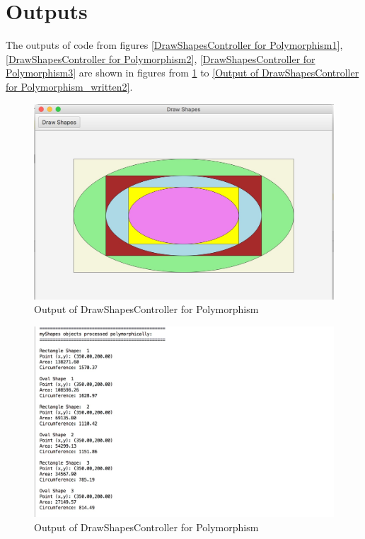 \documentclass[a4paper,12pt]{article}
\begin{document}
\section{Outputs}



The outputs of code from figures \ref{DrawShapesController for Polymorphism1},\ref{DrawShapesController for Polymorphism2}, \ref{DrawShapesController for Polymorphism3} are shown in figures from \ref{Output_of_DrawShapesController for Polymorphism} to \ref{Output of DrawShapesController for Polymorphism_written2}.


\begin{figure}[H]
   \centering
   \includegraphics[width = 17cm]{geometric_configuration1} %
   \caption{Output of DrawShapesController for Polymorphism}
   \label{Output_of_DrawShapesController for Polymorphism}
\end{figure}


\begin{figure}[H]
   \centering
   \includegraphics[width = 17cm]{geometric_configuration_written1} %
   \caption{Output of DrawShapesController for Polymorphism}
   \label{Output of DrawShapesController for Polymorphism_written}
\end{figure}
\end{document}
